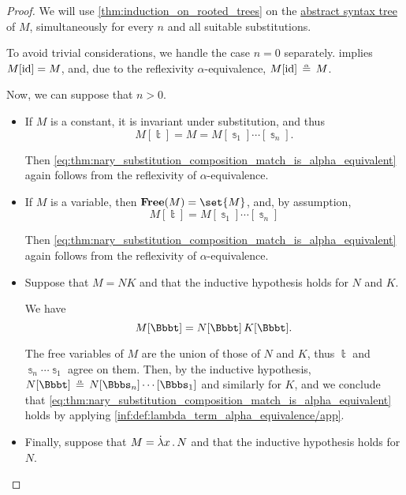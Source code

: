 \begin{proof}
  We will use \cref{thm:induction_on_rooted_trees} on the \hyperref[def:lambda_term_ast]{abstract syntax tree} of \( M \), simultaneously for every \( n \) and all suitable substitutions.

  To avoid trivial considerations, we handle the case \( n = 0 \) separately.  implies \( M[\operatorname{id}] = M \), and, due to the reflexivity \( \alpha \)-equivalence, \( M[\id] \aequiv M \).

  Now, we can suppose that \( n > 0 \).

  \begin{itemize}
    \item If \( M \) is a constant, it is invariant under substitution, and thus
    \begin{equation*}
      M[\Bbbt] = M = M[\Bbbs_1] \cdots [\Bbbs_n].
    \end{equation*}

    Then \eqref{eq:thm:nary_substitution_composition_match_is_alpha_equivalent} again follows from the reflexivity of \( \alpha \)-equivalence.

    \item If \( M \) is a variable, then \( \op*{Free}(M) = \set{ M } \), and, by assumption,
    \begin{equation*}
      M[\Bbbt] = M[\Bbbs_1] \cdots [\Bbbs_n]
    \end{equation*}

    Then \eqref{eq:thm:nary_substitution_composition_match_is_alpha_equivalent} again follows from the reflexivity of \( \alpha \)-equivalence.

    \item Suppose that \( M = NK \) and that the inductive hypothesis holds for \( N \) and \( K \).

    We have
    \begin{equation*}
      M[\Bbbt] = N[\Bbbt] \thinspace K[\Bbbt].
    \end{equation*}

    The free variables of \( M \) are the union of those of \( N \) and \( K \), thus \( \Bbbt \) and \( \Bbbs_n \cdots \Bbbs_1 \) agree on them. Then, by the inductive hypothesis, \( N[\Bbbt] \aequiv N[\Bbbs_n] \cdots [\Bbbs_1] \) and similarly for \( K \), and we conclude that \eqref{eq:thm:nary_substitution_composition_match_is_alpha_equivalent} holds by applying \ref{inf:def:lambda_term_alpha_equivalence/app}.

    \item Finally, suppose that \( M = \qabs x N \) and that the inductive hypothesis holds for \( N \).


\end{itemize}
\end{proof}
